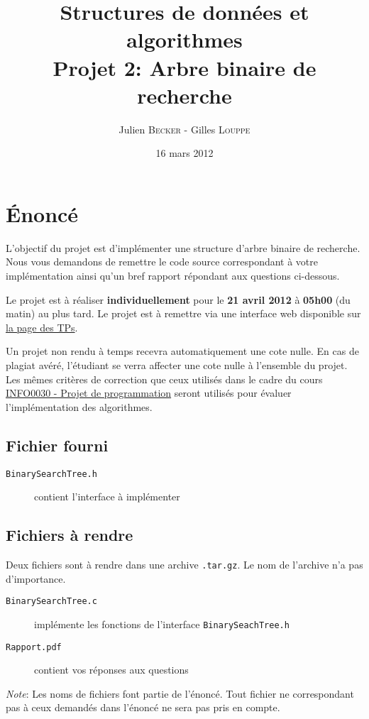 \documentclass[a4paper,10pt]{article}
\title{
    \textbf{Structures de données et algorithmes}\\
    Projet 2: Arbre binaire de recherche
}
\author{Julien \textsc{Becker} - Gilles \textsc{Louppe}}
\date{16 mars 2012}
\begin{document}
\maketitle

\section*{\'Enoncé}

L'objectif du projet est d'implémenter une structure d'arbre binaire de
recherche. Nous vous demandons de remettre le code source correspondant à votre
implémentation ainsi qu'un bref rapport répondant aux questions ci-dessous.

Le projet est à réaliser {\bf individuellement} pour le {\bf 21 avril 2012} à
{\bf 05h00} (du matin) au plus tard. Le projet est à remettre via une interface
web disponible sur \href{http://www.montefiore.ulg.ac.be/~glouppe/2011-2012/students.info0902.php}{la page des TPs}.

Un projet non rendu à temps recevra automatiquement une cote nulle. En cas de
plagiat avéré, l'étudiant se verra affecter une cote nulle à l'ensemble du
projet. Les mêmes critères de correction que ceux utilisés dans le cadre du
cours \href{http://www.montefiore.ulg.ac.be/~info0030/}{INFO0030 - Projet de programmation}
seront utilisés pour évaluer l'implémentation des algorithmes.

\subsection*{Fichier fourni}
\begin{description}
\item[\texttt{BinarySearchTree.h}] contient l'interface à implémenter
\end{description}
\subsection*{Fichiers à rendre}
Deux fichiers sont à rendre dans une archive \texttt{.tar.gz}. Le nom de l'archive n'a pas d'importance.
\begin{description}
\item[\texttt{BinarySearchTree.c}] implémente les fonctions de l'interface \texttt{BinarySeachTree.h}
\item[\texttt{Rapport.pdf}] contient vos réponses aux questions
\end{description}

{\em Note}: Les noms de fichiers font partie de l'énoncé. Tout fichier ne
correspondant pas à ceux demandés dans l'énoncé ne sera pas pris en compte.
\end{document}
